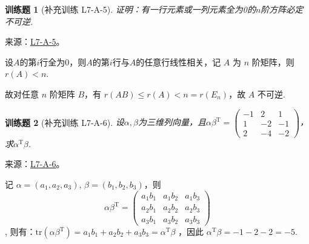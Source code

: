 \documentclass[UTF8,12pt,a4paper,fontset=fandol]{ctexart}
\newtheorem{exercise}{训练题}[section]
\begin{document}
\begin{exercise}[补充训练 L7-A-5]\label{prob:L7-A-5}
证明：有一行元素或一列元素全为0的$n$阶方阵必定不可逆.
\end{exercise}
\noindent 来源：\href{https://github.com/yhwu-is/Linear-Algebra-Left-Undone/blob/new/%E8%AE%B2%E4%B9%89/%E4%B8%93%E9%A2%98/7%20%E7%BA%BF%E6%80%A7%E6%98%A0%E5%B0%84%E7%9F%A9%E9%98%B5%E8%A1%A8%E7%A4%BA%E4%B8%8E%E7%9F%A9%E9%98%B5%E8%BF%90%E7%AE%97%E5%9F%BA%E7%A1%80.tex}{L7-A-5}。
\begin{solve}
设$A$的第$i$行全为0，则$A$的第$i$行与$A$的任意行线性相关，记 $A$ 为 $n$ 阶矩阵，则$r(A) < n$.

            故对任意 $n$ 阶矩阵 $B$，有 $r(AB) \leqslant r(A) < n = r(E_n)$，故 $A$ 不可逆.
\end{solve}

\begin{exercise}[补充训练 L7-A-6]\label{prob:L7-A-6}
设$\alpha,\beta$为三维列向量，且$\alpha\beta^\mathrm{T}=\begin{pmatrix}
                -1 & 2  & 1  \\
                1  & -2 & -1 \\
                2  & -4 & -2
            \end{pmatrix}$，求$\alpha^\mathrm{T}\beta$.
\end{exercise}
\noindent 来源：\href{https://github.com/yhwu-is/Linear-Algebra-Left-Undone/blob/new/%E8%AE%B2%E4%B9%89/%E4%B8%93%E9%A2%98/7%20%E7%BA%BF%E6%80%A7%E6%98%A0%E5%B0%84%E7%9F%A9%E9%98%B5%E8%A1%A8%E7%A4%BA%E4%B8%8E%E7%9F%A9%E9%98%B5%E8%BF%90%E7%AE%97%E5%9F%BA%E7%A1%80.tex}{L7-A-6}。
\begin{solve}
记 $\alpha = (a_1,a_2,a_3)$, $\beta = (b_1,b_2,b_3)$，则 
\[\alpha\beta^\mathrm{T} = \begin{pmatrix}
                    a_1b_1 & a_1b_2 & a_1b_3 \\
                    a_2b_1 & a_2b_2 & a_2b_3 \\
                    a_3b_1 & a_3b_2 & a_3b_3
                \end{pmatrix}\]
,
            则有：$\text{tr}(\alpha\beta^\mathrm{T}) = a_1b_1+a_2b_2+a_3b_3 = \alpha^\mathrm{T}\beta$ ，因此 $\alpha^\mathrm{T}\beta = -1-2-2 = -5$.
\end{solve}
\end{document}

